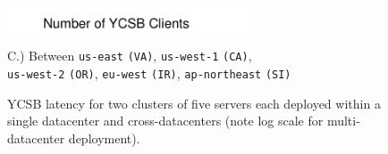 \begin{figure}[t!]
\begin{center}
\includegraphics[width=2.8in]{figs/hat-ycsb-label.pdf}
\end{center}
\begin{center}{C.) Between \texttt{us-east} \texttt{(VA)}, \texttt{us-west-1} \texttt{(CA)},\\ \texttt{us-west-2} \texttt{(OR)}, \texttt{eu-west} \texttt{(IR)}, \texttt{ap-northeast} \texttt{(SI)}}\end{center}
\caption{YCSB latency for two clusters of five servers each 
  deployed within a single datacenter and cross-datacenters (note log
  scale for multi-datacenter deployment).}
\label{fig:wan-lat}
\end{figure}

